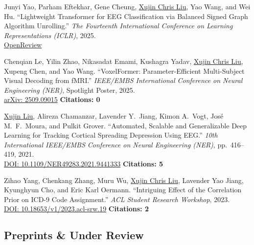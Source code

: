 \documentclass[11pt,a4paper]{article}
\begin{document}
\begin{enumerate}[leftmargin=*, label={[\arabic*]}, itemsep=6pt, resume]

  \item Junyi Yao, Parham Eftekhar, Gene Cheung, \underline{Xujin Chris Liu}, Yao Wang, and Wei Hu.
    ``Lightweight Transformer for EEG Classification via Balanced Signed Graph Algorithm Unrolling.''
    \textit{The Fourteenth International Conference on Learning Representations (ICLR)}, 2025.\\
    \href{https://openreview.net/forum?id=zxsLio384j}{OpenReview}

  \item Chenqian Le, Yilin Zhao, Nikasadat Emami, Kushagra Yadav, \underline{Xujin Chris Liu}, Xupeng Chen, and Yao Wang.
    ``VoxelFormer: Parameter-Efficient Multi-Subject Visual Decoding from fMRI.''
    \textit{IEEE/EMBS International Conference on Neural Engineering (NER)}, Spotlight Poster, 2025. \\
    \href{https://arxiv.org/abs/2509.09015}{arXiv: 2509.09015} \hfill \textbf{Citations: 0}

  \item \underline{Xujin Liu}, Alireza Chamanzar, Lavender Y.\ Jiang, Kimon A.\ Vogt, Jos\'{e} M.\ F.\ Moura, and Pulkit Grover.
    ``Automated, Scalable and Generalizable Deep Learning for Tracking Cortical Spreading Depression Using EEG.''
    \textit{10th International IEEE/EMBS Conference on Neural Engineering (NER)}, pp.\ 416--419, 2021. \\
    \href{https://doi.org/10.1109/NER49283.2021.9441333}{DOI: 10.1109/NER49283.2021.9441333} \hfill \textbf{Citations: 5}

  \item Zihao Yang, Chenkang Zhang, Muru Wu, \underline{Xujin Chris Liu}, Lavender Yao Jiang, Kyunghyun Cho, and Eric Karl Oermann.
    ``Intriguing Effect of the Correlation Prior on ICD-9 Code Assignment.''
    \textit{ACL Student Research Workshop}, 2023. \\
    \href{https://doi.org/10.18653/v1/2023.acl-srw.19}{DOI: 10.18653/v1/2023.acl-srw.19} \hfill \textbf{Citations: 2}

\end{enumerate}

\subsection*{Preprints \& Under Review}
\end{document}
